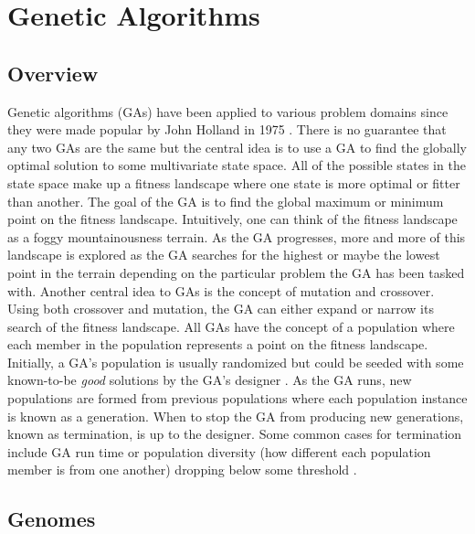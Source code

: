 \chapter{Genetic Algorithms}


\label{Chapter2}

\section{Overview}

Genetic algorithms (GAs) have been applied to various problem domains since they were made popular by John Holland in 1975 \cite{ColinReeves}. There is no guarantee that any two GAs are the same but the central idea is to use a GA to find the globally optimal solution to some multivariate state space. All of the possible states in the state space make up a fitness landscape where one state is more optimal or fitter than another. The goal of the GA is to find the global maximum or minimum point on the fitness landscape. Intuitively, one can think of the fitness landscape as a foggy mountainousness terrain. As the GA progresses, more and more of this landscape is explored as the GA searches for the highest or maybe the lowest point in the terrain depending on the particular problem the GA has been tasked with. Another central idea to GAs is the concept of mutation and crossover. Using both crossover and mutation, the GA can either expand or narrow its search of the fitness landscape. All GAs have the concept of a population where each member in the population represents a point on the fitness landscape. Initially, a GA's population is usually randomized but could be seeded with some known-to-be \textit{good} solutions by the GA's designer \cite{DBLP:conf/gem/Diaz-GomezH07}. As the GA runs, new populations are formed from previous populations where each population instance is known as a generation. When to stop the GA from producing new generations, known as termination, is up to the designer. Some common cases for termination include GA run time or population diversity (how different each population member is from one another) dropping below some threshold \cite{ColinReeves}.             

\section{Genomes}


